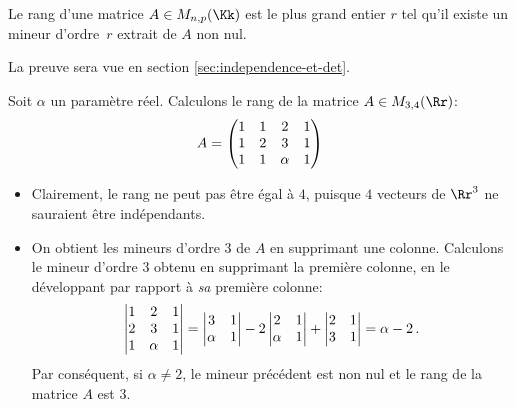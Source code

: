 \documentclass[class=report,crop=false]{standalone}
\begin{document}
\begin{theoreme}
\label{th:mineur}
Le rang d'une matrice $A \in M_{n,p}(\Kk)$ est le plus grand entier $r$
tel qu'il existe un mineur d'ordre~$r$ extrait de $A$ non nul.
\end{theoreme}

La preuve sera vue en section \ref{sec:independence-et-det}.

\medskip

\begin{exemple}
\label{exemple:calcul-rang}
Soit $\alpha$ un paramètre réel. Calculons le rang
de la matrice $A \in M_{3,4}(\Rr)$:
$$A= \begin{pmatrix}
1 & 1& 2&1\cr
1&2&3&1\cr
1&1&\alpha & 1 \cr
\end{pmatrix}$$

\begin{itemize}
  \item Clairement, le rang ne peut pas être égal à $4$, puisque $4$ vecteurs de $\Rr^3$ ne sauraient être indépendants.

  \item On obtient les mineurs d'ordre $3$ de $A$ en supprimant une colonne.
  Calculons le mineur d'ordre $3$ obtenu en supprimant la première
  colonne, en le développant par rapport à \emph{sa} première colonne:
$$\left | \begin{matrix}
1 & 2 & 1 \cr
2 & 3& 1 \cr
1& \alpha & 1 \cr
\end{matrix} \right |
=\left |\begin{matrix}3&1 \cr
\alpha & 1 \cr
\end{matrix}\right |
-2 \left | \begin{matrix}
2&1 \cr
\alpha & 1 \cr
\end{matrix}\right |
+\left | \begin{matrix}
2&1 \cr
3 & 1 \cr
\end{matrix}\right | = \alpha -2 \,.$$
Par conséquent, si $\alpha \neq 2$, le mineur précédent est non nul
et le rang de la matrice $A$ est $3$.


\end{itemize}
\end{exemple}
\end{document}
